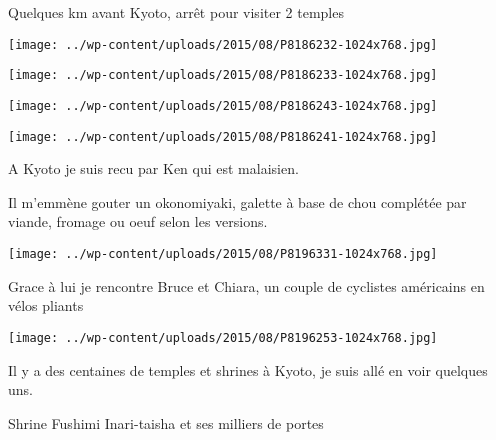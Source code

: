  

 Quelques km avant Kyoto, arrêt pour visiter 2 temples 

 

\begin{center} \texttt{[image: ../wp-content/uploads/2015/08/P8186232-1024x768.jpg]} \end{center}

 

 

\begin{center} \texttt{[image: ../wp-content/uploads/2015/08/P8186233-1024x768.jpg]} \end{center}

 

 

\begin{center} \texttt{[image: ../wp-content/uploads/2015/08/P8186243-1024x768.jpg]} \end{center}

 

 

\begin{center} \texttt{[image: ../wp-content/uploads/2015/08/P8186241-1024x768.jpg]} \end{center}

 

 A Kyoto je suis recu par Ken qui est malaisien. 

 Il m'emmène gouter un okonomiyaki, galette à base de chou complétée par viande, fromage ou oeuf selon les versions. 

 

\begin{center} \texttt{[image: ../wp-content/uploads/2015/08/P8196331-1024x768.jpg]} \end{center}

 

 Grace à lui je rencontre Bruce et Chiara, un couple de cyclistes américains en vélos pliants 

 

\begin{center} \texttt{[image: ../wp-content/uploads/2015/08/P8196253-1024x768.jpg]} \end{center}

 

 Il y a des centaines de temples et shrines à Kyoto, je suis allé en voir quelques uns. 

 Shrine Fushimi Inari-taisha et ses milliers de portes 

